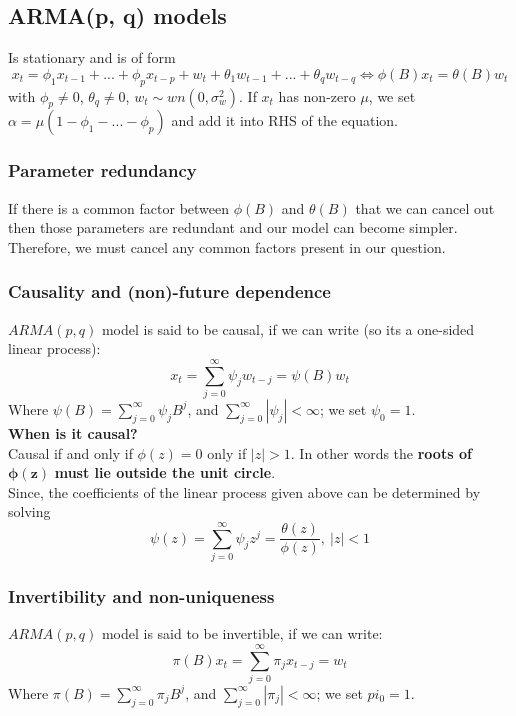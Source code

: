 \documentclass[11pt]{article}
\newcommand{\noi}{\noindent}
\begin{document}
\subsection{ARMA(p, q) models}
\noi Is stationary and is of form
$$x_t = \phi_1 x_{t-1} + ... + \phi_p x_{t-p} + w_t + \theta_1 w_{t-1} + ... + \theta_q w_{t-q} \Leftrightarrow \phi(B)x_t = \theta(B)w_t$$
\noi with $\phi_p \neq 0$, $\theta_q \neq 0$, $w_t \sim wn(0, \sigma_w^2)$. If $x_t$ has non-zero $\mu$, we set $\alpha = \mu(1 - \phi_1 - ... - \phi_p)$ and add it into RHS of the equation.

\subsubsection{Parameter redundancy}
\noi If there is a common factor between $\phi(B)$ and $\theta(B)$ that we can cancel out then those parameters are redundant and our model can become simpler. Therefore, we must cancel any common factors present in our question.

\subsubsection{Causality and (non)-future dependence}
\noi $ARMA(p,q)$ model is said to be causal, if we can write (so its a one-sided linear process):
$$x_t = \sum_{j=0}^{\infty}{\psi_jw_{t-j} = \psi(B)w_t}$$
\noi Where $\psi(B) = \sum_{j=0}^{\infty}{\psi_j B^j}$, and $\sum_{j=0}^{\infty}|\psi_j| < \infty$; we set $\psi_0 = 1$. \\

\noi \textbf{When is it causal?} \\
\noi Causal if and only if $\phi(z) = 0$ only if $|z|>1$. In other words the \textbf{roots of} $\boldsymbol{\phi(z)}$ \textbf{must lie outside the unit circle}. \\

\noi Since, the coefficients of the linear process given above can be determined by solving
$$\psi(z) = \sum_{j=0}^{\infty}{\psi_j z^j} = \frac{\theta(z)}{\phi(z)}, \: |z| <1$$

\subsubsection{Invertibility and non-uniqueness}
$ARMA(p, q)$ model is said to be invertible, if we can write:
$$\pi(B)x_t = \sum_{j=0}^{\infty}\pi_j x_{t-j} = w_t$$
\noi Where $\pi(B) = \sum_{j=0}^{\infty}\pi_j B^j$, and $\sum_{j=0}^{\infty}{|\pi_j|} < \infty$; we set $pi_0 = 1$. \\
\end{document}
